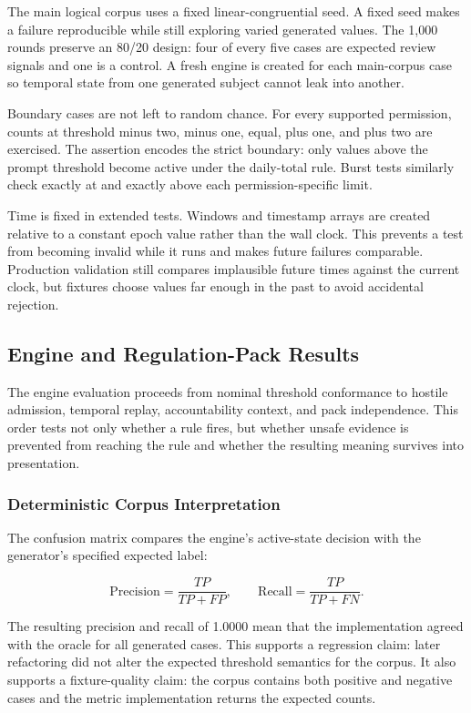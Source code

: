 The main logical corpus uses a fixed linear-congruential seed. A fixed seed makes a failure reproducible while still exploring varied generated values. The 1,000 rounds preserve an 80/20 design: four of every five cases are expected review signals and one is a control. A fresh engine is created for each main-corpus case so temporal state from one generated subject cannot leak into another.

Boundary cases are not left to random chance. For every supported permission, counts at threshold minus two, minus one, equal, plus one, and plus two are exercised. The assertion encodes the strict boundary: only values above the prompt threshold become active under the daily-total rule. Burst tests similarly check exactly at and exactly above each permission-specific limit.

Time is fixed in extended tests. Windows and timestamp arrays are created relative to a constant epoch value rather than the wall clock. This prevents a test from becoming invalid while it runs and makes future failures comparable. Production validation still compares implausible future times against the current clock, but fixtures choose values far enough in the past to avoid accidental rejection.

\subsection{Engine and Regulation-Pack Results}

The engine evaluation proceeds from nominal threshold conformance to hostile admission, temporal replay, accountability context, and pack independence. This order tests not only whether a rule fires, but whether unsafe evidence is prevented from reaching the rule and whether the resulting meaning survives into presentation.

\subsubsection{Deterministic Corpus Interpretation}

The confusion matrix compares the engine's active-state decision with the generator's specified expected label:

\begin{equation}
\mathrm{Precision}=\frac{TP}{TP+FP}, \qquad
\mathrm{Recall}=\frac{TP}{TP+FN}.
\end{equation}

The resulting precision and recall of 1.0000 mean that the implementation agreed with the oracle for all generated cases. This supports a regression claim: later refactoring did not alter the expected threshold semantics for the corpus. It also supports a fixture-quality claim: the corpus contains both positive and negative cases and the metric implementation returns the expected counts.

